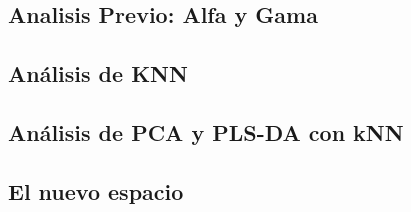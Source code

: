 \subsection{Analisis Previo: Alfa y Gama}


\newpage
\subsection{Análisis de KNN}


\newpage
\subsection{Análisis de PCA y PLS-DA con kNN}


\newpage
\subsection{El nuevo espacio}

